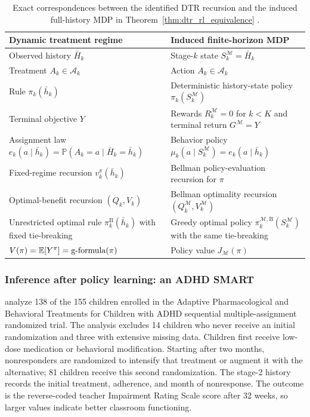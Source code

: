 \begin{table}[htbp]
\centering
\caption{Exact correspondences between the identified DTR recursion and the induced full-history MDP in Theorem~\ref{thm:dtr_rl_equivalence} \citep{murphy2003dtr, schulte2014qlearning}.}
\label{tab:rl_ci_dictionary}
{\small
\renewcommand{\arraystretch}{1.25}
\begin{tabularx}{\textwidth}{>{\raggedright\arraybackslash}X >{\raggedright\arraybackslash}X}
\toprule
Dynamic treatment regime & Induced finite-horizon MDP \\
\midrule
Observed history $\bar H_k$ & Stage-$k$ state $S_k^{\mathcal M}=\bar H_k$ \\
Treatment $A_k\in\mathcal A_k$ & Action $A_k\in\mathcal A_k$ \\
Rule $\pi_k(\bar h_k)$ & Deterministic history-state policy $\pi_k(S_k^{\mathcal M})$ \\
Terminal objective $Y$ & Rewards $R_k^{\mathcal M}=0$ for $k<K$ and terminal return $G^{\mathcal M}=Y$ \\
Assignment law $e_k(a\mid\bar h_k)=\mathbb P(A_k=a\mid\bar H_k=\bar h_k)$ & Behavior policy $\mu_k(a\mid S_k^{\mathcal M})=e_k(a\mid\bar h_k)$ \\
Fixed-regime recursion $v_k^\pi(\bar h_k)$ & Bellman policy-evaluation recursion for $\pi$ \\
Optimal-benefit recursion $(Q_k,V_k)$ & Bellman optimality recursion $(Q_k^{\mathcal M},V_k^{\mathcal M})$ \\
Unrestricted optimal rule $\pi_k^{\mathrm B}(\bar h_k)$ with fixed tie-breaking & Greedy optimal policy $\pi_k^{\mathcal M,\mathrm B}(S_k^{\mathcal M})$ with the same tie-breaking \\
$V(\pi)=\mathbb E[Y^\pi]=\textnormal{g-formula}(\pi)$ & Policy value $J_{\mathcal M}(\pi)$ \\
\bottomrule
\end{tabularx}
}
\end{table}
\FloatBarrier

\subsubsection*{Inference after policy learning: an ADHD SMART}

\citet{laber2014dtrchallenges} analyze 138 of the 155 children enrolled in the Adaptive Pharmacological and Behavioral Treatments for Children with ADHD sequential multiple-assignment randomized trial. The analysis excludes 14 children who never receive an initial randomization and three with extensive missing data. Children first receive low-dose medication or behavioral modification. Starting after two months, nonresponders are randomized to intensify that treatment or augment it with the alternative; 81 children receive this second randomization. The stage-2 history records the initial treatment, adherence, and month of nonresponse. The outcome is the reverse-coded teacher Impairment Rating Scale score after 32 weeks, so larger values indicate better classroom functioning.

